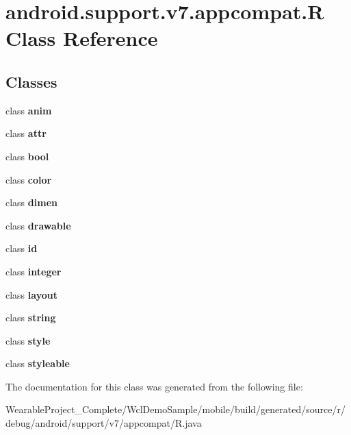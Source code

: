 \hypertarget{classandroid_1_1support_1_1v7_1_1appcompat_1_1R}{}\section{android.\+support.\+v7.\+appcompat.\+R Class Reference}
\label{classandroid_1_1support_1_1v7_1_1appcompat_1_1R}
\subsection*{Classes}
\begin{DoxyCompactItemize}
\item 
class {\bfseries anim}
\item 
class {\bfseries attr}
\item 
class {\bfseries bool}
\item 
class {\bfseries color}
\item 
class {\bfseries dimen}
\item 
class {\bfseries drawable}
\item 
class {\bfseries id}
\item 
class {\bfseries integer}
\item 
class {\bfseries layout}
\item 
class {\bfseries string}
\item 
class {\bfseries style}
\item 
class {\bfseries styleable}
\end{DoxyCompactItemize}


The documentation for this class was generated from the following file\+:\begin{DoxyCompactItemize}
\item 
Wearable\+Project\+\_\+\+Complete/\+Wcl\+Demo\+Sample/mobile/build/generated/source/r/debug/android/support/v7/appcompat/R.\+java\end{DoxyCompactItemize}
